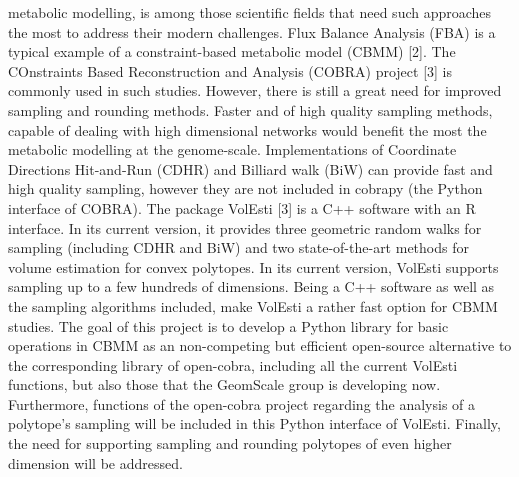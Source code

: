 \documentclass[a4paper, 12pt]{article}
\begin{document}
metabolic modelling, is among those scientific fields that need such approaches the most to address their modern challenges. Flux Balance Analysis (FBA) is a typical example of a constraint-based metabolic model (CBMM) [2].
The COnstraints Based Reconstruction and Analysis (COBRA) project [3] is commonly used in such studies. However, there is still a great need for improved sampling and rounding methods. Faster and of high quality sampling methods, capable of dealing with high dimensional networks would benefit the most the metabolic modelling at the genome-scale. Implementations of Coordinate Directions Hit-and-Run (CDHR) and Billiard walk (BiW) can provide fast and high quality sampling, however they are not included in cobrapy (the Python interface of COBRA). 
The package VolEsti [3] is a C++ software with an R interface. In its current version, it provides three geometric random walks for sampling (including CDHR and BiW) and two state-of-the-art methods for volume estimation for convex polytopes. In its current version, VolEsti supports sampling up to a few hundreds of dimensions. Being a C++ software as well as the sampling algorithms included, make VolEsti a rather fast option for CBMM studies. 
The goal of this project is to develop a Python library for basic operations in CBMM as an non-competing but efficient open-source alternative to the corresponding library of open-cobra, including all the current VolEsti functions, but also those that the GeomScale group is developing now. Furthermore, functions of the open-cobra project regarding the analysis of a polytope’s  sampling will be included in this Python interface of VolEsti. Finally, the need for supporting sampling and rounding polytopes of even higher dimension will be addressed. 
\end{document}
